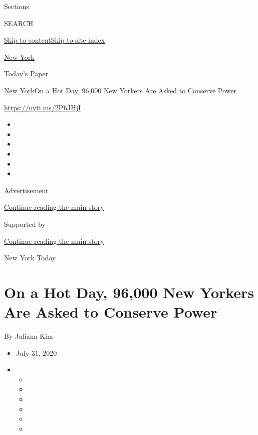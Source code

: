 Sections

SEARCH

\protect\hyperlink{site-content}{Skip to
content}\protect\hyperlink{site-index}{Skip to site index}

\href{https://www.nytimes.com/section/nyregion}{New York}

\href{https://myaccount.nytimes.com/auth/login?response_type=cookie\&client_id=vi}{}

\href{https://www.nytimes.com/section/todayspaper}{Today's Paper}

\href{/section/nyregion}{New York}\textbar{}On a Hot Day, 96,000 New
Yorkers Are Asked to Conserve Power

\url{https://nyti.ms/2PbJHjI}

\begin{itemize}
\item
\item
\item
\item
\item
\item
\end{itemize}

Advertisement

\protect\hyperlink{after-top}{Continue reading the main story}

Supported by

\protect\hyperlink{after-sponsor}{Continue reading the main story}

New York Today

\hypertarget{on-a-hot-day-96000-new-yorkers-are-asked-to-conserve-power}{%
\section{On a Hot Day, 96,000 New Yorkers Are Asked to Conserve
Power}\label{on-a-hot-day-96000-new-yorkers-are-asked-to-conserve-power}}

By Juliana Kim

\begin{itemize}
\item
  July 31, 2020
\item
  \begin{itemize}
  \item
  \item
  \item
  \item
  \item
  \item
  \end{itemize}
\end{itemize}

